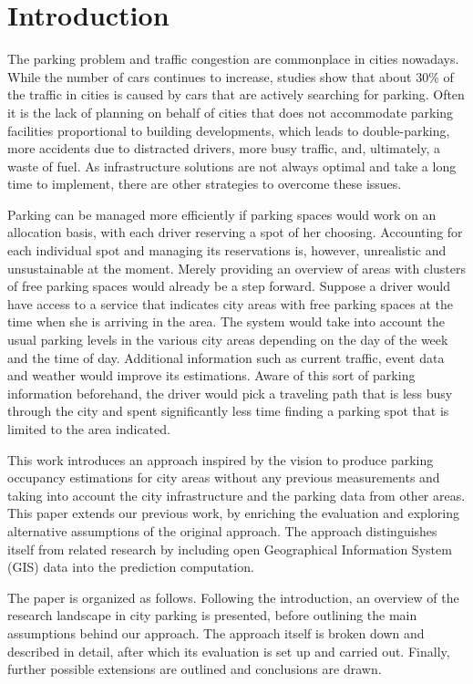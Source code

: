 \section{Introduction}
	The parking problem and traffic congestion are commonplace in cities nowadays. While the number of cars continues to increase, studies show that about 30\% of the traffic in cities is caused by cars that are actively searching for parking. Often it is the lack of planning on behalf of cities that does not accommodate parking facilities proportional to building developments, which leads to double-parking, more accidents due to distracted drivers, more busy traffic, and, ultimately, a waste of fuel. As infrastructure solutions are not always optimal and take a long time to implement, there are other strategies to overcome these issues.
	
	Parking can be managed more efficiently if parking spaces would work on an allocation basis, with each driver reserving a spot of her choosing. Accounting for each individual spot and managing its reservations is, however, unrealistic and unsustainable at the moment. Merely providing an overview of areas with clusters of free parking spaces would already be a step forward. Suppose a driver would have access to a service that indicates city areas with free parking spaces at the time when she is arriving in the area. The system would take into account the usual parking levels in the various city areas depending on the day of the week and the time of day. Additional information such as current traffic, event data and weather would improve its estimations. Aware of this sort of parking information beforehand, the driver would pick a traveling path that is less busy through the city and spent significantly less time finding a parking spot that is limited to the area indicated.
	
	This work introduces an approach inspired by the vision to produce parking occupancy estimations for city areas without any previous measurements and taking into account the city infrastructure and the parking data from other areas. This paper extends our previous work, by enriching the evaluation and exploring alternative assumptions of the original approach. The approach distinguishes itself from related research by including open Geographical Information System (GIS) data into the prediction computation.
	
	The paper is organized as follows. Following the introduction, an overview of the research landscape in city parking is presented, before outlining the main assumptions behind our approach. The approach itself is broken down and described in detail, after which its evaluation is set up and carried out. Finally, further possible extensions are outlined and conclusions are drawn.

